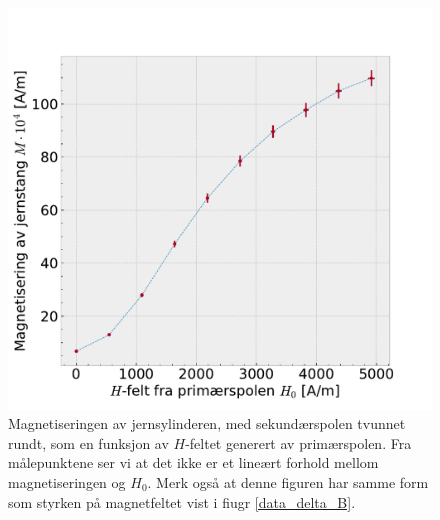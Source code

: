 \documentclass[%
 reprint,
 amsmath,amssymb,
 aps,
 norsk,
]{revtex4-1}
\begin{document}
\begin{figure}[h!]
  \centering
  \includegraphics[scale=0.45]{magnetisering.pdf}
  \caption{Magnetiseringen av jernsylinderen, med sekundærspolen tvunnet rundt, som en funksjon av $H$-feltet generert av primærspolen. Fra målepunktene ser vi at det ikke er et lineært forhold mellom magnetiseringen og $H_0$. Merk også at denne figuren har samme form som styrken på magnetfeltet vist i fiugr \vref{data_delta_B}.}
  \label{MH0}
\end{figure}
\end{document}
